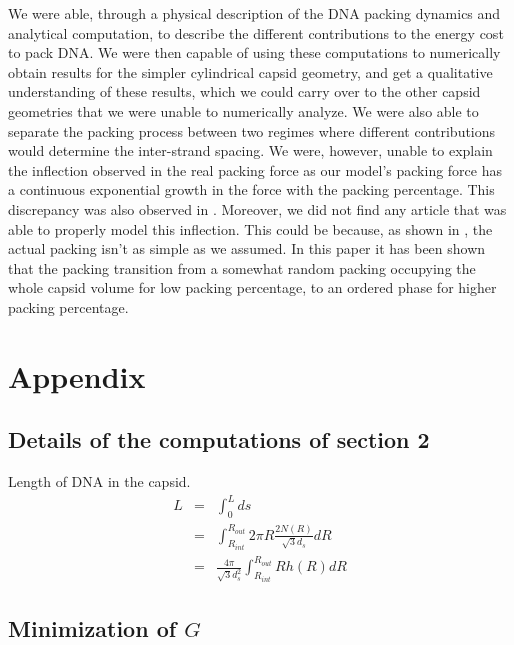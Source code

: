 \documentclass{article}
\begin{document}
We were able, through a physical description of the DNA packing dynamics and analytical computation, to describe the different contributions to the energy cost to pack DNA. We were then capable of using these computations to numerically obtain results for the simpler cylindrical capsid geometry, and get a qualitative understanding of these results, which we could carry over to the other capsid geometries that we were unable to numerically analyze. We were also able to separate the packing process between two regimes where different contributions would determine the inter-strand spacing. We were, however, unable to explain the inflection observed in the real packing force as our model's packing force has a continuous exponential growth in the force with the packing percentage. This discrepancy was also observed in \cite{purohit2003, phillips2005}. Moreover, we did not find any article that was able to properly model this inflection. This could be because, as shown in \cite{comoli2008}, the actual packing isn't as simple as we assumed. In this paper it has been shown that the packing transition from a somewhat random packing occupying the whole capsid volume for low packing percentage, to an ordered phase for higher packing percentage.

\clearpage
\FloatBarrier
\printbibliography[
    heading=bibintoc,
    title={References}]
\clearpage
\FloatBarrier

\section*{Appendix}

\subsection*{Details of the computations of section 2}

Length of DNA in the capsid.
\begin{eqnarray}
    L & = & \int_{0}^{L} ds \\
    &=& \int_{R_{int}} ^{R_{out}} 2 \pi R \frac{2 N(R)}{\sqrt{3} d_s} dR \\
    &=& \frac{4 \pi}{\sqrt{3} d_s^2} \int_{R_{int}}^{R_{out}} R h(R) dR
    \label{eq:Ldef}
\end{eqnarray}


\subsection*{Minimization of $G$ \label{sec:Gmin}}
\end{document}
